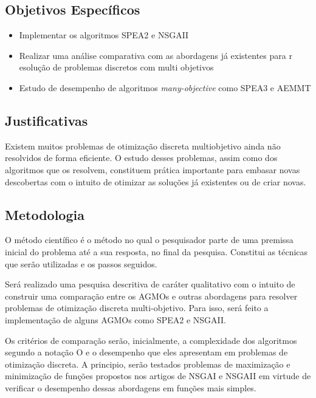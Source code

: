 \documentclass[]{article}
\begin{document}
\subsection{Objetivos Específicos}

	\begin{itemize}
		\item Implementar os algoritmos SPEA2\cite{SPEA2} e NSGAII\cite{NSGAII}
		\item Realizar uma análise comparativa com as abordagens já existentes para r esolução de problemas discretos com multi objetivos
		\item Estudo de desempenho de algoritmos \textit{many-objective} como SPEA3 e AEMMT
	\end{itemize}

\subsection{Justificativas}
	
	Existem muitos problemas de otimização discreta multiobjetivo ainda não resolvidos de forma eficiente. O estudo desses problemas, assim como dos algoritmos que os resolvem, constituem prática importante para embasar novas descobertas com o intuito de otimizar as soluções já existentes ou de criar novas.

\subsection{Metodologia}
	
	O método científico é o método no qual o pesquisador parte de uma premissa inicial do problema até a sua resposta, no final da pesquisa. Constitui as técnicas que serão utilizadas e os passos seguidos. 
	
	Será realizado uma pesquisa descritiva de caráter qualitativo com o intuito de construir uma comparação entre os AGMOs e outras abordagens para resolver problemas de otimização discreta multi-objetivo. Para isso, será feito a implementação de alguns AGMOs como SPEA2\cite{SPEA2} e NSGAII\cite{NSGAII}.
	
	Os critérios de comparação serão, inicialmente, a complexidade dos algoritmos segundo a notação O e o desempenho que eles apresentam em problemas de otimização discreta. A principio, serão testados problemas de maximização e minimização de funções propostos nos artigos de NSGAI\cite{NSGAI} e NSGAII\cite{NSGAII} em virtude de verificar o desempenho dessas abordagens em funções mais simples.
	
\end{document}
